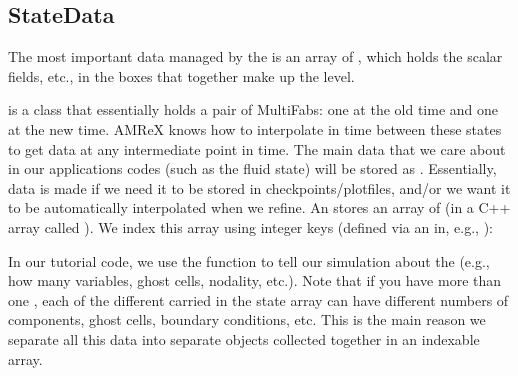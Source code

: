 \documentclass[letterpaper,10pt,english]{sphinxmanual}
\begin{document}
\subsection{StateData}
\label{\detokenize{AmrLevel:statedata}}
\sphinxAtStartPar
The most important data managed by the  is an array of
, which holds the scalar fields, etc., in the boxes that
together make up the level.

\sphinxAtStartPar
{} is a class that essentially holds a pair of MultiFabs: one at
the old time and one at the new time. AMReX knows how to interpolate in time
between these states to get data at any intermediate point in time. The main
data that we care about in our applications codes (such as the fluid state)
will be stored as .  Essentially, data is made 
if we need it to be stored in checkpoints/plotfiles, and/or we want it to be
automatically interpolated when we refine.  An  stores an array
of  (in a C++ array called ). We index this array
using integer keys (defined via an  in, e.g., ):

\begin{sphinxVerbatim}[commandchars=\\\{\}]
     
                  
\end{sphinxVerbatim}

\sphinxAtStartPar
In our tutorial code, we use the function  to
tell our simulation about the  (e.g., how many variables, ghost
cells, nodality, etc.). Note that if you have more than one ,
each of the different  carried in the state array can have
different numbers of components, ghost cells, boundary conditions, etc.
This is the main reason we separate all this data into separate 
objects collected together in an indexable array.
\end{document}
